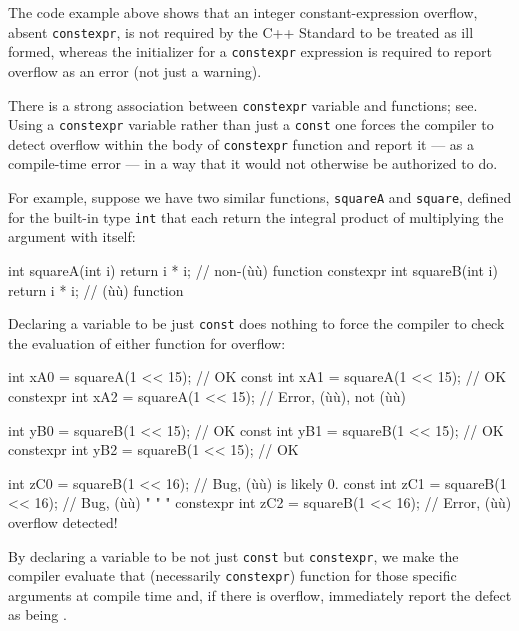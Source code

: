 \noindent The code example above shows that an integer constant-expression
overflow, absent \lstinline!constexpr!, is not required by the C++ Standard
to be treated as ill formed, whereas the initializer for a
\lstinline!constexpr! expression is required to report overflow as an error
(not just a warning).

There is a strong association between \lstinline!constexpr! variable and
functions; see\linebreak[4]%
. Using a
\lstinline!constexpr! variable rather than just a \lstinline!const! one forces the
compiler to detect overflow within the body of \lstinline!constexpr!
function and report it --- as a compile-time error --- in a way that it
would not otherwise be authorized to do.

For example, suppose we have two similar functions, \lstinline!squareA! and
\lstinline!square!, defined for the built-in type \lstinline!int! that each return the integral product of multiplying the
argument with itself:

\begin{emcppslisting}[emcppsbatch=e2]
          int squareA(int i) { return i * i; }  // non-(ù{}ù) function
constexpr int squareB(int i) { return i * i; }  // (ù{}ù) function
\end{emcppslisting}

\noindent Declaring a variable to be just \lstinline!const! does nothing to force the
compiler to check the evaluation of either function for overflow:

\begin{emcppslisting}[emcppsbatch=e2]
                int xA0 = squareA(1 << 15);  // OK
          const int xA1 = squareA(1 << 15);  // OK
constexpr       int xA2 = squareA(1 << 15);  // Error, (ù{}ù), not (ù{}ù)

                int yB0 = squareB(1 << 15);  // OK
          const int yB1 = squareB(1 << 15);  // OK
constexpr       int yB2 = squareB(1 << 15);  // OK

                int zC0 = squareB(1 << 16);  // Bug, (ù{}ù) is likely 0.
          const int zC1 = squareB(1 << 16);  // Bug, (ù{}ù)  "   "    "
constexpr       int zC2 = squareB(1 << 16);  // Error, (ù{}ù) overflow detected!
\end{emcppslisting}

\noindent By declaring a variable to be not just \lstinline!const! but
\lstinline!constexpr!, we make the compiler evaluate that (necessarily
\lstinline!constexpr!) function for those specific arguments at compile
time and, if there is overflow, immediately report the defect as being
.

